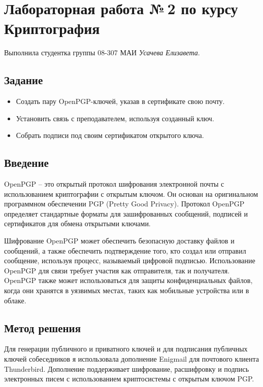 \documentclass[12pt]{article}
\begin{document}
\section*{Лабораторная работа №\,2 по курсу Криптография}

Выполнила студентка группы 08-307 МАИ \textit{Усачева Елизавета}.

\subsection*{Задание}

\begin{itemize}
    \item Создать пару OpenPGP-ключей, указав в сертификате свою почту.
    \item Установить связь с преподавателем, используя созданный ключ.
    \item Собрать подписи под своим сертификатом открытого ключа.
\end{itemize}

\subsection*{Введение}

OpenPGP – это открытый протокол шифрования электронной почты с использованием криптографии с открытым ключом. Он основан на оригинальном программном обеспечении PGP (Pretty Good Privacy). Протокол OpenPGP определяет стандартные форматы для зашифрованных сообщений, подписей и сертификатов для обмена открытыми ключами.

Шифрование OpenPGP может обеспечить безопасную доставку файлов и сообщений, а также обеспечить подтверждение того, кто создал или отправил сообщение, используя процесс, называемый цифровой подписью. Использование OpenPGP для связи требует участия как отправителя, так и получателя. OpenPGP также может использоваться для защиты конфиденциальных файлов, когда они хранятся в уязвимых местах, таких как мобильные устройства или в облаке.

\subsection*{Метод решения}

Для генерации публичного и приватного ключей и для подписания публичных ключей собеседников я использовала дополнение Enigmail для почтового клиента Thunderbird. Дополнение поддерживает шифрование, расшифровку и подпись электронных писем с использованием криптосистемы с открытым ключом PGP.
\end{document}
